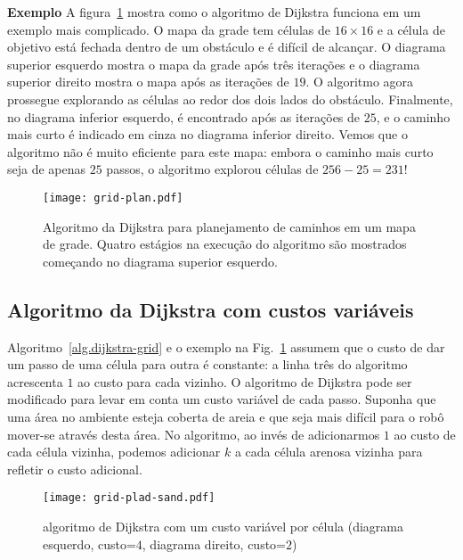 {\medskip

\noindent\textbf{Exemplo} A figura~\ref{fig.dijkstra} mostra como o algoritmo de Dijkstra funciona em um exemplo mais complicado. O mapa da grade tem células de $16\times 16$ e a célula de objetivo  está fechada dentro de um obstáculo e é difícil de alcançar. O diagrama superior esquerdo mostra o mapa da grade após três iterações e o diagrama superior direito mostra o mapa após as iterações de $19$. O algoritmo agora prossegue explorando as células ao redor dos dois lados do obstáculo. Finalmente, no diagrama inferior esquerdo,  é encontrado após as iterações de $25$, e o caminho mais curto é indicado em cinza no diagrama inferior direito. Vemos que o algoritmo não é muito eficiente para este mapa: embora o caminho mais curto seja de apenas $25$ passos, o algoritmo explorou células de $256-25=231$!

\begin{figure}
\begin{center}
\texttt{[image: grid-plan.pdf]}
\end{center}
\caption{Algoritmo da Dijkstra para planejamento de caminhos em um mapa de grade. Quatro estágios na execução do algoritmo são mostrados começando no diagrama superior esquerdo.}\label{fig.dijkstra}
\end{figure}

\subsection{Algoritmo da Dijkstra com custos variáveis}

Algoritmo~\ref{alg.dijkstra-grid} e o exemplo na Fig.~\ref{fig.dijkstra} assumem que o custo de dar um passo de uma célula para outra é constante: a linha três do algoritmo acrescenta $1$ ao custo para cada vizinho. O algoritmo de Dijkstra pode ser modificado para levar em conta um custo variável de cada passo. Suponha que uma área no ambiente esteja coberta de areia e que seja mais difícil para o robô mover-se através desta área. No algoritmo, ao invés de adicionarmos $1$ ao custo de cada célula vizinha, podemos adicionar $k$ a cada célula arenosa vizinha para refletir o custo adicional.

\begin{figure}
\begin{center}
\texttt{[image: grid-plad-sand.pdf]}
\end{center}
\caption{algoritmo de Dijkstra com um custo variável por célula (diagrama esquerdo, custo=$4$, diagrama direito, custo=$2$)}\label{fig.path-sand}
\end{figure}

}
